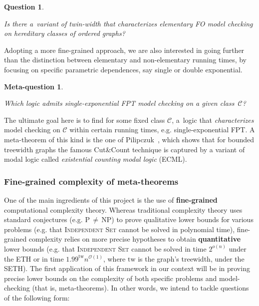 \documentclass[a4paper,11pt]{article}
\newcommand{\fo}{\textsf{FO}\xspace}
\newcommand{\Oh}{\mathcal{O}}
\newtheorem{quest}{Question}
\newenvironment{question}
  {\begin{quest}\begin{mdframed}[style=questionstyle]}
  {\end{mdframed}\end{quest}}
\newtheorem{metaquest}{Meta-question}
\newenvironment{metaquestion}
  {\begin{metaquest}\begin{mdframed}[style=metaquestionstyle]}
  {\end{mdframed}\end{metaquest}}
\newcommand{\jf}[1]{\noindent{\bf {\color{green!40!black}{\sc JF:}  #1}}}
\newcommand{\michael}[1]{\noindent{\bf {\color{orange!80!black}{\sc Michael:}  #1}}}
\begin{document}
\begin{question}\label{q:elem2}
    Is there a~variant of twin-width that characterizes \textsl{elementary} \fo model checking on hereditary classes of ordered graphs?
\end{question}

Adopting a more fine-grained approach, we are also interested in going further than the distinction between elementary and non-elementary running times, by focusing on specific parametric dependences, say single or double exponential.
\begin{metaquestion}\label{metaq:singleexp}
    Which logic admits single-exponential FPT model checking on a given class~$\mathcal{C}$?
\end{metaquestion}
The ultimate goal here is to find for some fixed class $\mathcal{C}$, a~logic that \emph{characterizes} model checking on $\mathcal{C}$ within certain running times, e.g. single-exponential FPT.
A meta-theorem of this kind is the one of Pilipczuk~\cite{Pilipczuk11}, which shows that for bounded treewidth graphs the famous Cut\&Count technique is captured by a variant of modal logic called \emph{existential counting modal logic} (ECML). 

\subsubsection{Fine-grained complexity of meta-theorems}\label{subtask:1.2}


One of the main ingredients of this project is the use of \textbf{fine-grained}
computational complexity theory. Whereas traditional complexity theory uses
standard conjectures (e.g. P\,$\neq$\,NP) to prove qualitative lower bounds for
various problems (e.g. that \textsc{Independent Set} cannot be solved in
polynomial time), fine-grained complexity relies on more precise hypotheses to
obtain \textbf{quantitative} lower bounds (e.g. that \textsc{Independent Set}
cannot be solved in time $2^{o(n)}$ under the ETH or in time
$1.99^{\textrm{tw}}n^{\Oh(1)}$, where $\textrm{tw}$ is the graph's treewidth,
under the SETH).
The first application of this framework in our context will be in proving precise lower bounds on the complexity of both specific problems and model-checking (that is, meta-theorems). In other words, we intend to tackle questions of the following form:
\end{document}
